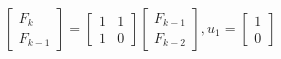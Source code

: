 \documentclass[preview]{standalone}
\begin{document}
\begin{center}
$$\begin{bmatrix} F_k \\ F_{k - 1} \end{bmatrix} = \begin{bmatrix} 1 & 1 \\ 1 & 0 \end{bmatrix} \begin{bmatrix} F_{k -1 } \\ F_{k - 2} \end{bmatrix}, u_1 = \begin{bmatrix} 1 \\ 0 \end{bmatrix}$$
\end{center}
\end{document}
